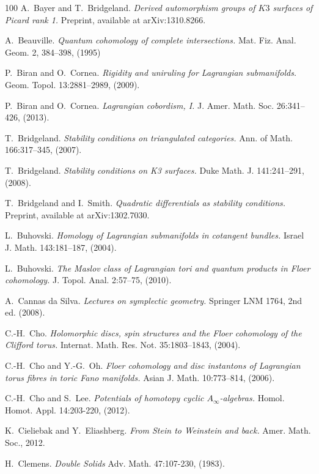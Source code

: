 \begin{thebibliography}{100}
A.~Bayer and T.~Bridgeland.
\emph{Derived automorphism groups of $K3$ surfaces of Picard rank 1.}
Preprint, available at arXiv:1310.8266.

A.~Beauville.
\emph{Quantum cohomology of complete intersections.}
Mat. Fiz. Anal. Geom. 2, 384--398, (1995)

P.~Biran and O.~Cornea.
\emph{Rigidity and uniruling for Lagrangian submanifolds.}
Geom. Topol. 13:2881--2989, (2009).

P.~Biran and O.~Cornea.
\emph{Lagrangian cobordism, I.}
J. Amer. Math. Soc. 26:341--426, (2013).

T.~Bridgeland.
\emph{Stability conditions on triangulated categories.}
Ann. of Math. 166:317--345, (2007).

T.~Bridgeland.
\emph{Stability conditions on K3 surfaces.}
Duke Math. J. 141:241--291, (2008).

T.~Bridgeland and I.~Smith.
\emph{Quadratic differentials as stability conditions.}
Preprint, available at arXiv:1302.7030.

L.~Buhovski.
\emph{Homology of Lagrangian submanifolds in cotangent bundles.}
Israel J. Math. 143:181--187,  (2004).

L.~Buhovski.
\emph{The Maslov class of Lagrangian tori and quantum products in Floer cohomology.}
J. Topol. Anal. 2:57--75, (2010).

A.~Cannas da Silva.
\emph{Lectures on symplectic geometry.}
Springer LNM 1764, 2nd ed. (2008).

C.-H.~Cho.
\emph{Holomorphic discs, spin structures and the Floer cohomology of the Clifford torus.}
Internat. Math. Res. Not. 35:1803--1843, (2004).

C.-H.~Cho and Y.-G.~Oh.
\emph{Floer cohomology and disc instantons of Lagrangian torus fibres in toric Fano manifolds.}
Asian J. Math. 10:773--814, (2006).

C.-H.~Cho and S.~Lee.
\emph{Potentials of homotopy cyclic $A_{\infty}$-algebras.}
Homol. Homot. Appl. 14:203-220, (2012).

K.~Cieliebak and Y.~Eliashberg.
\emph{From Stein to Weinstein and back.}
Amer. Math. Soc., 2012.

H.~Clemens.
\emph{Double Solids}
Adv. Math. 47:107-230, (1983).


\end{thebibliography}

